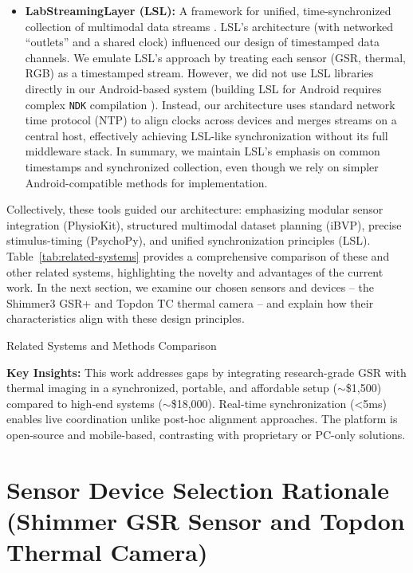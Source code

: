 \documentclass{report}
\begin{document}
\begin{itemize}
        \item \textbf{LabStreamingLayer (LSL):} A framework for unified, time-synchronized collection of multimodal data streams \cite{lsl}. LSL's architecture (with networked ``outlets'' and a shared clock) influenced our design of timestamped data channels. We emulate LSL's approach by treating each sensor (GSR, thermal, RGB) as a timestamped stream. However, we did not use LSL libraries directly in our Android-based system (building LSL for Android requires complex \texttt{NDK} compilation \cite{lsl}). Instead, our architecture uses standard network time protocol (NTP) to align clocks across devices and merges streams on a central host, effectively achieving LSL-like synchronization without its full middleware stack. In summary, we maintain LSL's emphasis on common timestamps and synchronized collection, even though we rely on simpler Android-compatible methods for implementation.
    \end{itemize}

    Collectively, these tools guided our architecture: emphasizing modular sensor integration (PhysioKit), structured multimodal dataset planning (iBVP), precise stimulus-timing (PsychoPy), and unified synchronization principles (LSL). Table~\ref{tab:related-systems} provides a comprehensive comparison of these and other related systems, highlighting the novelty and advantages of the current work. In the next section, we examine our chosen sensors and devices -- the Shimmer3 GSR+ and Topdon TC thermal camera -- and explain how their characteristics align with these design principles.

    \begin{table}[htbp]
        \centering
        \small
        \caption{Related Systems and Methods Comparison}
        \label{tab:related-systems}

        \vspace{0.3cm}
        \textbf{Key Insights:} This work addresses gaps by integrating research-grade GSR with thermal imaging in a synchronized, portable, and affordable setup ($\sim$\$1,500) compared to high-end systems ($\sim$\$18,000). Real-time synchronization (<5ms) enables live coordination unlike post-hoc alignment approaches. The platform is open-source and mobile-based, contrasting with proprietary or PC-only solutions.
    \end{table}


    \section{Sensor Device Selection Rationale (Shimmer GSR Sensor and Topdon Thermal Camera)}
    \label{sec:sensor_selection}
\end{document}
